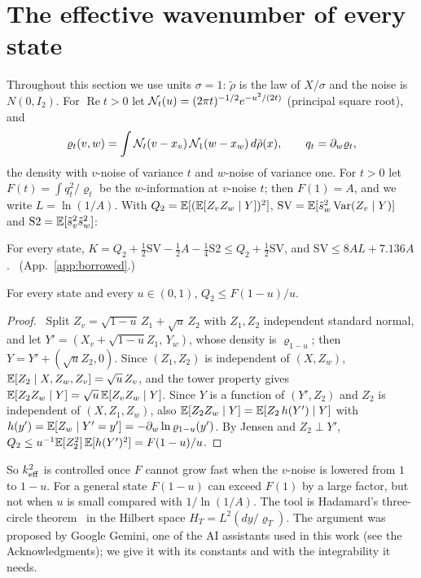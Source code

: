 \section{The effective wavenumber of every state}
\label{sec:circles}

Throughout this section we use units $\sigma=1$: $\tilde\rho$ is the law of $X/\sigma$ and the noise is $N(0,I_2)$.
For $\operatorname{Re}t>0$ let $\mathcal N_t(u)=(2\pi t)^{-1/2}e^{-u^2/(2t)}$ (principal square root), and
\begin{equation}
\varrho_t(v,w)=\int\mathcal N_t(v-x_v)\,\mathcal N_1(w-x_w)\,d\tilde\rho(x),\qquad q_t=\partial_w\varrho_t ,
\end{equation}
the density with $v$-noise of variance $t$ and $w$-noise of variance one.
For $t>0$ let $F(t)=\int q_t^2/\varrho_t$ be the $w$-information at $v$-noise $t$; then $F(1)=A$, and we write $L=\ln(1/A)$.
With $Q_2=\mathbb{E}[(\mathbb{E}[Z_vZ_w\mid Y])^2]$, $\mathrm{SV}=\mathbb{E}[\tilde s_w^2\operatorname{Var}(Z_v\mid Y)]$ and $\mathrm{S2}=\mathbb{E}[\tilde s_v^2\tilde s_w^2]$:

\begin{lemma}\label{lem:K}
For every state,
$K=Q_2+\tfrac12\mathrm{SV}-\tfrac12A-\tfrac14\mathrm{S2}\le Q_2+\tfrac12\mathrm{SV}$, and $\mathrm{SV}\le8AL+7.136A$.
\proofst\ (App.~\ref{app:borrowed}.)
\end{lemma}

\begin{lemma}[Smoothing]\label{lem:smooth}
For every state and every $u\in(0,1)$, $Q_2\le F(1-u)/u$.
\end{lemma}
\begin{proof}\proofst\
Split $Z_v=\sqrt{1-u}\,Z_1+\sqrt u\,Z_2$ with $Z_1,Z_2$ independent standard normal, and let $Y'=(X_v+\sqrt{1-u}Z_1,\,Y_w)$, whose density is $\varrho_{1-u}$; then $Y=Y'+(\sqrt uZ_2,0)$.
Since $(Z_1,Z_2)$ is independent of $(X,Z_w)$, $\mathbb{E}[Z_2\mid X,Z_w,Z_v]=\sqrt u\,Z_v$, and the tower property gives $\mathbb{E}[Z_2Z_w\mid Y]=\sqrt u\,\mathbb{E}[Z_vZ_w\mid Y]$.
Since $Y$ is a function of $(Y',Z_2)$ and $Z_2$ is independent of $(X,Z_1,Z_w)$, also $\mathbb{E}[Z_2Z_w\mid Y]=\mathbb{E}[Z_2\,h(Y')\mid Y]$ with $h(y')=\mathbb{E}[Z_w\mid Y'=y']=-\partial_w\ln\varrho_{1-u}(y')$.
By Jensen and $Z_2\perp Y'$, $Q_2\le u^{-1}\mathbb{E}[Z_2^2]\,\mathbb{E}[h(Y')^2]=F(1-u)/u$.
\end{proof}

So $k_{\mathrm{eff}}^2$ is controlled once $F$ cannot grow fast when the $v$-noise is lowered from $1$ to $1-u$.
For a general state $F(1-u)$ can exceed $F(1)$ by a large factor, but not when $u$ is small compared with $1/\ln(1/A)$.
The tool is Hadamard's three-circle theorem~\cite{Conway,Titchmarsh} in the Hilbert space $H_T=L^2(dy/\varrho_T)$.
The argument was proposed by Google Gemini, one of the AI assistants used in this work (see the Acknowledgments); we give it with its constants and with the integrability it needs.

